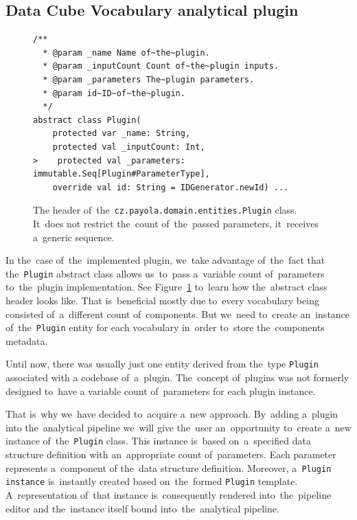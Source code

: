 \subsection{Data Cube Vocabulary analytical plugin}

\begin{figure}
  \begin{verbatim}
/**
  * @param _name Name of~the~plugin.
  * @param _inputCount Count of~the~plugin inputs.
  * @param _parameters The~plugin parameters.
  * @param id~ID~of~the~plugin.
  */
abstract class Plugin(
    protected var _name: String,
    protected val _inputCount: Int,
>    protected val _parameters: immutable.Seq[Plugin#ParameterType],
    override val id: String = IDGenerator.newId) ...
  \end{verbatim}
  \caption{The header of~the~\texttt{cz.payola.domain.entities.Plugin} class. It~does not restrict the~count
  of~the~passed parameters, it~receives a~generic sequence.}
  \label{fig:plugin-trait-code}
\end{figure}

In the~case of~the~implemented plugin, we~take advantage of~the~fact that the~\texttt{Plugin} abstract class allows us~to~pass a~variable count of~parameters to~the~plugin implementation. See Figure~\ref{fig:plugin-trait-code} to~learn how the~abstract class header 
looks like. That is~beneficial mostly due to~every vocabulary being consisted of~a~different count of~components. But we~need to~create an~instance of~the~\texttt{Plugin} entity
for each vocabulary in~order to~store the~components metadata.

Until now, there was usually just one entity derived from the~type \texttt{Plugin} associated with
a codebase of~a~plugin. The~concept of~plugins was not formerly designed to~have
a variable count of~parameters for each plugin instance.

That is~why we~have decided to~acquire a~new approach. By~adding a~plugin 
into the~analytical pipeline we~will give the~user an~opportunity to~create a~new instance of~the~\texttt{Plugin} class. This instance is~based on~a~specified data structure definition
with an~appropriate count of~parameters. Each parameter represents a~component 
of the~data structure definition. Moreover, a~\texttt{Plugin instance} is~instantly created 
based on~the~formed \texttt{Plugin} template. A~representation of~that instance is~consequently 
rendered into~the~pipeline editor and the~instance itself bound into~the~analytical pipeline.

